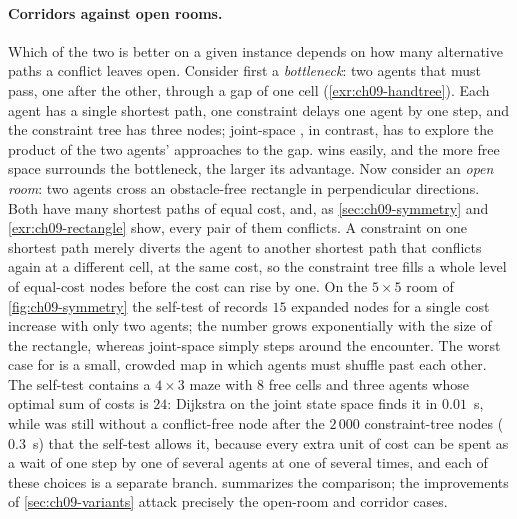 \paragraph{Corridors against open rooms.} Which of the two is better on a
given instance depends on how many alternative paths a conflict leaves open.
Consider first a \emph{bottleneck}: two agents that must pass, one after the
other, through a gap of one cell (\cref{exr:ch09-handtree}). Each agent has
a single shortest path, one constraint delays one agent by one step, and
the constraint tree has three nodes; joint-space \astar, in contrast, has to
explore the product of the two agents' approaches to the gap. \cbs wins
easily, and the more free space surrounds the bottleneck, the larger its
advantage. Now consider an \emph{open room}: two agents cross an obstacle-free
rectangle in perpendicular directions. Both have many shortest paths of
equal cost, and, as \cref{sec:ch09-symmetry} and \cref{exr:ch09-rectangle}
show, every pair of them conflicts. A constraint on one shortest path
merely diverts the agent to another shortest path that conflicts again at a
different cell, at the same cost, so the constraint tree fills a whole level
of equal-cost nodes before the cost can rise by one. On the $5 \times 5$
room of \cref{fig:ch09-symmetry} the self-test of 
records $15$ expanded nodes for a single cost increase with only two agents;
the number grows exponentially with the size of the rectangle, whereas
joint-space \astar simply steps around the encounter. The worst case for
\cbs is a small, crowded map in which agents must shuffle past each other.
The self-test contains a $4 \times 3$ maze with $8$ free cells and three
agents whose optimal sum of costs is $24$: Dijkstra on the joint state space
finds it in $0.01$~s, while \cbs was still without a conflict-free node
after the $2\,000$ constraint-tree nodes ($0.3$~s) that the self-test
allows it, because every extra
unit of cost can be spent as a wait of one step by one of several agents
at one of several times, and each of these choices is a separate branch.
 summarizes the comparison; the improvements of
\cref{sec:ch09-variants} attack precisely the open-room and corridor cases.

